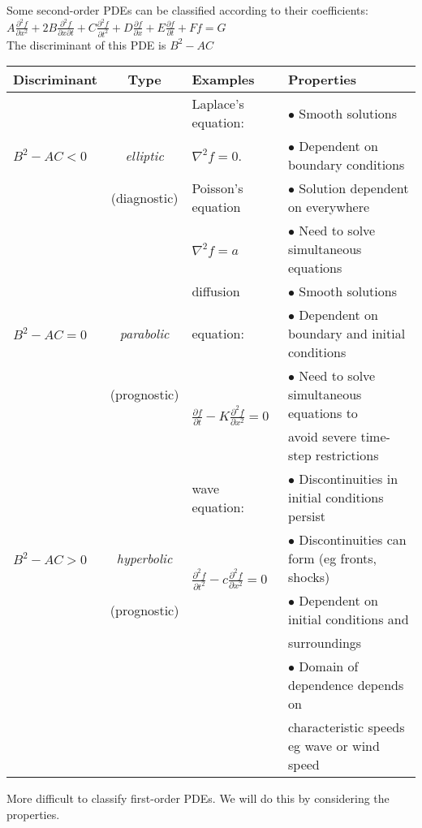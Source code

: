 Some second-order PDEs can be classified according to their coefficients:\\
{\centering$
A \frac{\partial^2 f}{\partial x^2}
+ 2B \frac{\partial^2 f}{\partial x \partial t}
+ C \frac{\partial^2 f}{\partial t^2}
+ D \frac{\partial f}{\partial x}
+ E \frac{\partial f}{\partial t}
+ Ff = G
$ \\ \vskip 4pt}
The discriminant of this PDE is $B^2 - AC$
\\ \vskip -6pt
{\setlength{\tabcolsep}{1pt}\renewcommand{\arraystretch}{1.1}
\begin{tabular}{l|c|l|l}
\bf Discriminant& \bf Type      & \bf Examples        & \bf Properties \\
\hline
               &                & Laplace's equation: & $\bullet$ Smooth solutions \\
$B^2 - AC < 0$ & {\em elliptic} & $\nabla^2 f = 0$.   & $\bullet$ Dependent on boundary conditions\\
               & (diagnostic)   & Poisson's equation  & $\bullet$ Solution dependent on everywhere \\
               &                & $\nabla^2 f = a$    & $\bullet$ Need to solve simultaneous equations\\
\hline
               &                & diffusion      & $\bullet$ Smooth solutions\\
$B^2 - AC = 0$ & {\em parabolic}& equation:           & $\bullet$ Dependent on boundary and initial conditions\\
               & (prognostic)   & \multirow{2}{*}{$\frac{\partial f}{\partial t} - K\frac{\partial^2f}{\partial x^2} = 0$} & 
                                                        $\bullet$ Need to solve simultaneous equations to \\
               &                &                     & \hphantom{$\bullet$} avoid severe time-step restrictions \\
\hline
               &                & wave equation:      & $\bullet$ Discontinuities in initial conditions persist\\
$B^2 - AC> 0$  & {\em hyperbolic}& \multirow{2}{*}{$\frac{\partial^2 f}{\partial t^2} - c\frac{\partial^2 f}{\partial x^2}=0$}
                                                      & $\bullet$ Discontinuities can form (eg fronts, shocks) \\
               & (prognostic)   &                     & $\bullet$ Dependent on initial conditions and\\
               &                &                     & \hphantom{$\bullet$} surroundings\\
               &                &                     & $\bullet$ Domain of dependence depends on \\
               &                &                     & \hphantom{$\bullet$} characteristic speeds eg wave or wind speed \\
\end{tabular}
}
More difficult to classify first-order PDEs. We will do this by considering the properties.

